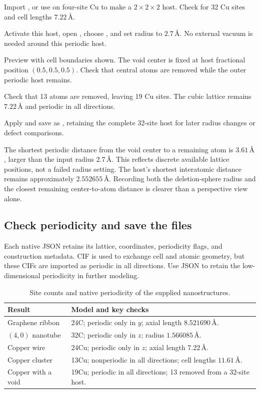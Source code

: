 \begin{steps}
  \item Import , or use  on four-site Cu to make a $2\times2\times2$ host. Check for 32 Cu sites and cell lengths $7.22\,\text{\AA}$.
  \item Activate this host, open , choose , and set radius to $2.7\,\text{\AA}$. No external vacuum is needed around this periodic host.
  \item Preview with cell boundaries shown. The void center is fixed at host fractional position \((0.5,0.5,0.5)\). Check that central atoms are removed while the outer periodic host remains.
  \item Check that 13 atoms are removed, leaving 19 Cu sites. The cubic lattice remains $7.22\,\text{\AA}$ and periodic in all directions.
  \item Apply and save as , retaining the complete 32-site host for later radius changes or defect comparisons.
\end{steps}

The shortest periodic distance from the void center to a remaining atom is $3.61\,\text{\AA}$, larger than the input radius $2.7\,\text{\AA}$. This reflects discrete available lattice positions, not a failed radius setting. The host's shortest interatomic distance remains approximately $2.552655\,\text{\AA}$. Recording both the deletion-sphere radius and the closest remaining center-to-atom distance is clearer than a perspective view alone.

\subsection{Check periodicity and save the files}

Each native JSON retains its lattice, coordinates, periodicity flags, and construction metadata. CIF is used to exchange cell and atomic geometry, but these CIFs are imported as periodic in all directions. Use JSON to retain the low-dimensional periodicity in further modeling.

\begin{table}[htbp]
\centering\small
\caption{Site counts and native periodicity of the supplied nanostructures.}
\begin{tabularx}{\linewidth}{lX}
\toprule
Result & Model and key checks\\
\midrule
Graphene ribbon & 24C; periodic only in $y$; axial length $8.521690\,\text{\AA}$.\\
$(4,0)$ nanotube & 32C; periodic only in $z$; radius $1.566085\,\text{\AA}$.\\
Copper wire & 24Cu; periodic only in $z$; axial length $7.22\,\text{\AA}$.\\
Copper cluster & 13Cu; nonperiodic in all directions; cell lengths $11.61\,\text{\AA}$.\\
Copper with a void & 19Cu; periodic in all directions; 13 removed from a 32-site host.\\
\bottomrule
\end{tabularx}
\end{table}

